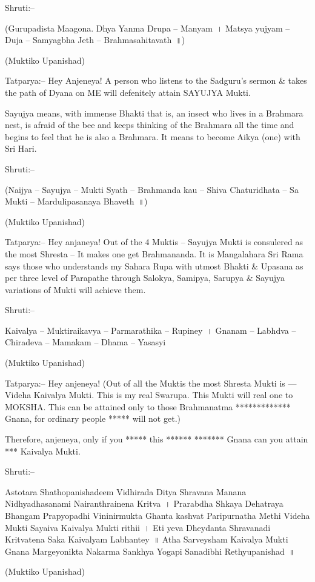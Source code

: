Shruti:–

(Gurupadista Maagona. Dhya Yanma Drupa – Manyam~। Matsya yujyam – Duja – Samyagbha Jeth – Brahmasahitavath~॥)

(Muktiko Upanishad)

Tatparya:– Hey Anjeneya! A person who listens to the Sadguru's sermon \& takes the path of Dyana on ME will defenitely attain SAYUJYA Mukti.

Sayujya means, with immense Bhakti that is, an insect who lives in a Brahmara nest, is afraid of the bee and keeps thinking of the Brahmara all the time and begins to feel that he is also a Brahmara. It means to become Aikya (one) with Sri Hari.

Shruti:–

(Naijya – Sayujya – Mukti Syath – Brahmanda kau – Shiva Chaturidhata – Sa Mukti – Mardulipasanaya Bhaveth~॥)

(Muktiko Upanishad)

Tatparya:– Hey anjaneya! Out of the 4 Muktis – Sayujya Mukti is consulered as the most Shresta – It makes one get Brahmananda. It is Mangalahara Sri Rama says those who understands my Sahara Rupa with utmost Bhakti \& Upasana as per three level of Parapathe through Salokya, Samipya, Sarupya \& Sayujya variations of Mukti will achieve them.

Shruti:–

Kaivalya – Muktiraikavya – Parmarathika – Rupiney~। Gnanam – Labhdva – Chiradeva – Mamakam – Dhama – Yasasyi 

(Muktiko Upanishad)

Tatparya:– Hey anjeneya! (Out of all the Muktis the most Shresta Mukti is — Videha Kaivalya Mukti. This is my real Swarupa. This Mukti will real one to MOKSHA. This can be attained only to those Brahmanatma ************* Gnana, for ordinary people ***** will not get.)

Therefore, anjeneya, only if you ***** this ****** ******* Gnana can you attain *** Kaivalya Mukti.

Shruti:–

Astotara Shathopanishadeem Vidhirada Ditya Shravana Manana Nidhyadhasanami Nairanthrainena Kritva~। Prarabdha Shkaya Dehatraya Bhangam Prapyopadhi Vininirmukta Ghanta kashvat Paripurnatha Methi Videha Mukti Sayaiva Kaivalya Mukti rithii~। Eti yeva Dheydanta Shravanadi Kritvatena Saka Kaivalyam Labhantey~॥ Atha Sarveysham Kaivalya Mukti Gnana Margeyonikta Nakarma Sankhya Yogapi Sanadibhi Rethyupanishad~॥

(Muktiko Upanishad)

